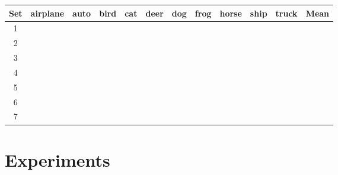 \documentclass[final]{cvpr}
\newcommand{\FM}{FixMatch }
\begin{document}
\begin{table*}
	\begin{center}
		\begin{tabular}{|c|c|c|c|c|c|c|c|c|c|c|c|}
			\hline
			Set & airplane & auto & bird & cat & deer & dog & frog & horse & ship & truck & Mean \\
			\hline\hline
1 &   &   &   &   &   &   &   &   &   &  &  \\
			\hline
			2 &   &   &   &   &   &   &   &   &   &    &  \\
			\hline
			3 &   &   &   &   &   &   &   &   &   &    &  \\
			\hline
			4 &   &   &   &   &   &   &   &   &   &   &   \\
			\hline
			5 &   &   &   &   &   &   &   &   &   &   &   \\
			\hline
			6 &   &   &   &   &   &   &   &   &   &   &   \\
\hline
			7 &   &   &   &   &   &   &   &   &   &   &   \\
			\hline		
		\end{tabular}
	\end{center}
	\caption{\textbf{Class accuracies.} One-shot semi-supervised average (of 2 runs) class accuracies for Cifar-10 test data with the \FM model, that was trained on sets of manually chosen prototypes for each class.  Prototype set 6 was modified from set 2 and prototype set 7 was modified from set 4 (i.e., prototype refining).
	}
	\label{tab:classAcc1}
\end{table*}



\section{Experiments}
\label{sec:exp}
\end{document}
